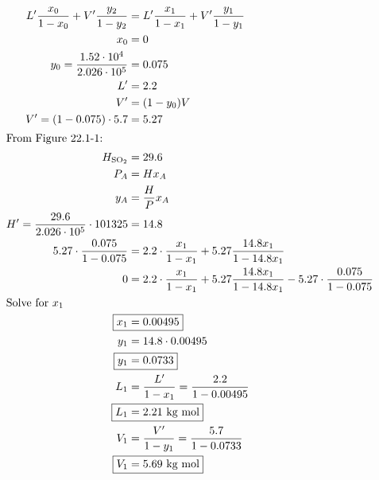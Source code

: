 \documentclass[12pt]{article}
\begin{document}
\begin{enumerate}
        
    \begin{align*}
        L' \frac{x_0}{1-x_0} + V'\frac{y_2}{1-y_2} &= L'\frac{x_1}{1-x_1} + V' \frac{y_1}{1-y_1} \\
        x_0 &= 0 \\
        y_0 = \frac{1.52 \cdot 10^{4}}{2.026 \cdot 10^{5}} &= 0.075 \\
        L' &= 2.2 \\
        V' &= (1 - y_0) V \\
        V' = (1 - 0.075) \cdot 5.7 &= 5.27 \\
        \intertext{From Figure 22.1-1:}
        H_{\mathrm{SO}_2} &= 29.6 \\
        P_A &= H x_A \\
        y_A &= \frac{H}{P} x_A \\
        H' = \frac{29.6}{2.026 \cdot 10^{5}} \cdot 101325 &= 14.8 \\
        5.27 \cdot \frac{0.075}{1-0.075} &= 2.2 \cdot \frac{x_1}{1-x_1} + 5.27 \frac{14.8x_1}{1-14.8 x_1} \\
        0 &= 2.2 \cdot \frac{x_1}{1-x_1} + 5.27 \frac{14.8x_1}{1-14.8 x_1} - 5.27 \cdot \frac{0.075}{1-0.075} \\
        \intertext{Solve for $x_1$}
        \Aboxed{x_1 &= 0.00495} \\
        y_1 &= 14.8 \cdot 0.00495 \\
        \Aboxed{y_1 &= 0.0733} \\
        L_1 &= \frac{L'}{1 - x_1} = \frac{2.2}{1 - 0.00495} \\
        \Aboxed{L_1 &= 2.21 \text{ kg mol}} \\
        V_1 &= \frac{V'}{1 - y_1} = \frac{5.7}{1 - 0.0733} \\
        \Aboxed{V_1 &= 5.69 \text{ kg mol}} \\
    \end{align*}


\end{enumerate}
\end{document}
